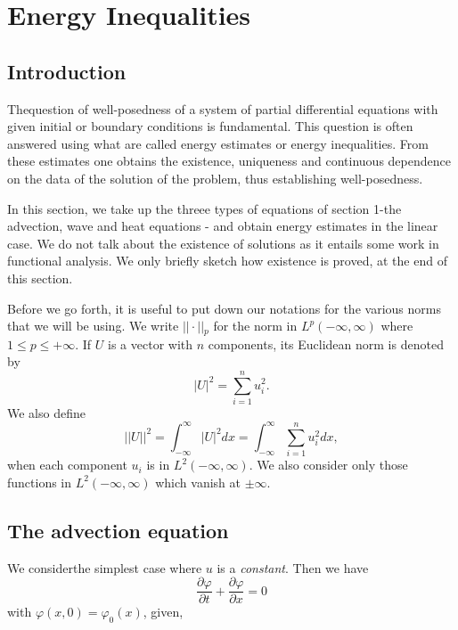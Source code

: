 
\chapter{Energy Inequalities}\label{chap4}

\section{Introduction}\label{chap4:sec4.1}

The\pageoriginale question of well-posedness of a system of partial
differential equations with given initial or boundary conditions is
fundamental. This question is often answered using what are called
energy estimates or energy inequalities. From these estimates one
obtains the existence, uniqueness and continuous dependence on the
data of the solution of the problem, thus establishing well-posedness.

In this section, we take up the threee types of equations of section
1-the advection, wave and heat equations - and obtain energy estimates
in the linear case. We do not talk about the existence of solutions as
it entails some work in functional analysis. We only briefly sketch
how existence is proved, at the end of this section. 

Before we go forth, it is useful to put down our notations for the
various norms that we will be using. We write $|| \cdot ||{}_p$ for
the norm in $L^p (-\infty, \infty)$ where $1 \leq p \leq + \infty$. If
$U$ is a vector with $n$ components, its Euclidean norm is denoted by 
\begin{equation*}
|U|^2  = \sum\limits^n_{i=1} u^2_i. \tag{4.1}\label{eq4.1}
\end{equation*}
We also define 
\begin{equation*}
||U||^2 = \int^\infty_{-\infty} |U|^2 dx  = \int^\infty_{-\infty}
\sum\limits^n_{i=1} u^2_i dx, \tag{4.2}\label{eq4.2}
\end{equation*}
when each component $u_i$ is in $L^2 (-\infty, \infty)$. We also
consider only those functions in $L^2(-\infty, \infty)$ which vanish
at $\pm \infty$. 

\section{The advection equation}\label{chap4:sec4.2}
We consider\pageoriginale the simplest case where $u$ is a {\em constant}. Then we
have
\begin{equation*}
\frac{\partial \varphi}{\partial t} + \frac{\partial \varphi}{\partial
x} = 0 \tag{4.3}\label{eq4.3}
\end{equation*}
with $\varphi(x,0) = \varphi_0 (x)$, given,

